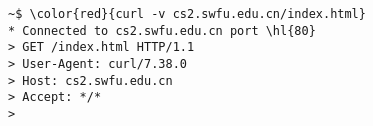 \documentclass[varwidth=20em,crop]{standalone}
\begin{document}
\begin{Verbatim}[commandchars=\\\{\}]
~$ \color{red}{curl -v cs2.swfu.edu.cn/index.html}
* Connected to cs2.swfu.edu.cn port \hl{80}
> GET /index.html HTTP/1.1
> User-Agent: curl/7.38.0
> Host: cs2.swfu.edu.cn
> Accept: */*
> 
\end{Verbatim}
\end{document}
